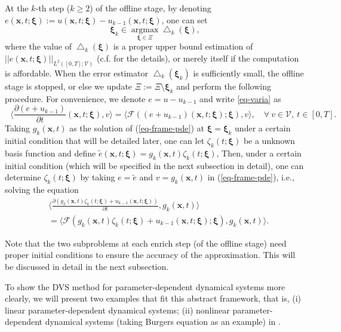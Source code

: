 \documentclass[10pt,a4paper]{article}
\numberwithin{equation}{section}
\numberwithin{lemma}{section}
\numberwithin{example}{section}
\numberwithin{definition}{section}
\numberwithin{assumption}{section}
\numberwithin{theorem}{section}
\numberwithin{proposition}{section}
\numberwithin{corollary}{section}
\numberwithin{remark}{section}
\begin{document}
At the $k$-th step ($k\ge 2$) of the offline stage, by denoting ${e}(\bm{x},t;\bm{\xi}):={u}(\bm{x},t;\bm{\xi})-{u}_{k-1}(\bm{x},t;\bm{\xi})$, one can set
$$
\bm{\xi}_k\in \mathop{\text{argmax}}\limits_{\bm{\xi}\in\Xi} \bigtriangleup_k(\bm{\xi}),
$$
where the value of $\bigtriangleup_k(\bm{\xi})$ is a proper upper bound estimation of 
$||e(\bm{x},t;\bm{\xi})||_{L^2([0, T];\mathcal{V})}$ (c.f.   for the details), or merely itself if the computation is affordable. 
When the error estimator $\bigtriangleup_k(\bm{\xi}_k)$ is sufficiently small, the offline stage is stopped, or else we update $\Xi:=\Xi \textbf{\textbackslash} \bm{\xi}_k$ and perform the following procedure. 
For convenience, we denote $e=u-u_{k-1}$ and write \eqref{eq-varia} as 
\begin{equation}
\label{eq-frame-pde}
~~~\Big\langle \frac{\partial (e+u_{k-1})}{\partial t}(\bm{x},t;\bm{\xi}),v\Big\rangle
=\langle \mathcal{F}((e+u_{k-1})(\bm{x},t;\bm{\xi});\bm{\xi}),v\rangle,
\quad \forall~ v\in \mathcal{V},~t\in [0,T].
\end{equation}
Taking $g_k(\bm{x},t)$ as the solution of (\ref{eq-frame-pde}) at $\bm{\xi}=\bm{\xi}_k$ under a certain initial condition that will be detailed later,   
one can let $\zeta_k(t;\bm{\xi})$ be a unknown basis function and define 
${\tilde e}(\bm{x},t;\bm{\xi})=g_k(\bm{x},t)\zeta_k(t;\bm{\xi})$,
Then, under a certain initial condition (which will be specified in the next subsection in detail), one can determine $\zeta_k(t;\bm{\xi})$ by taking $e={\tilde e}$ and $v=g_k(\bm{x},t)$ in (\ref{eq-frame-pde}), i.e., 
solving the equation
\begin{equation}
\begin{aligned}
\label{eq-frame-rode}
&\Big\langle \frac{\partial (g_k(\bm{x},t)\zeta_k(t;\bm{\xi})+u_{k-1}(\bm{x},t;\bm{\xi}))}{\partial t},g_k(\bm{x},t)\Big\rangle \\
&=\langle \mathcal{F}(g_k(\bm{x},t)\zeta_k(t;\bm{\xi})+u_{k-1}(\bm{x},t;\bm{\xi});\bm{\xi}),g_k(\bm{x},t)\rangle.
\end{aligned}
\end{equation}

Note that the two subproblems at each enrich step (of the offline stage) need proper initial conditions to ensure the accuracy of the approximation. This will be discussed in detail in the next subsection.

To show the DVS method for parameter-dependent dynamical systems more clearly, we will present two examples that fit this abstract framework, that is, (i) linear parameter-dependent dynamical systems; (ii) nonlinear parameter-dependent dynamical systems (taking Burgers equation as an example) in .
\end{document}

